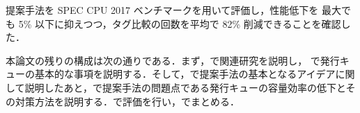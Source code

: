 提案手法を SPEC CPU 2017 ベンチマークを用いて評価し，性能低下を 最大でも 5\% 以下に抑えつつ，タグ比較の回数を平均で 82\% 削減できることを確認した．

本論文の残りの構成は次の通りである．まず，で関連研究を説明し， で発行キューの基本的な事項を説明する．そして，で提案手法の基本となるアイデアに関して説明したあと，で提案手法の問題点である発行キューの容量効率の低下とその対策方法を説明する．で評価を行い，でまとめる．



